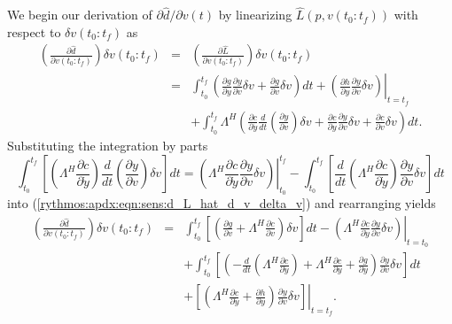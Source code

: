 \documentclass[pdf,ps2pdf,11pt]{SANDreport}
\begin{document}
We begin our derivation of $\partial {}\hat{d} / {}\partial v(t)$ by
linearizing $\hat{L}(p,v(t_0:t_f))$ with respect to $\delta
v(t_0:t_f)$ as
%
\begin{eqnarray}
\left( \frac{\partial \hat{d}}{\partial v(t_0:t_f)} \right) \delta v(t_0:t_f)
& = & \left( \frac{\partial \hat{L}}{\partial v(t_0:t_f)} \right) \delta v(t_0:t_f)
\nonumber \\
& = & \int_{t_0}^{t_f} \left( \frac{\partial g}{\partial y} \frac{\partial y}{\partial v} \delta v +  \frac{\partial g}{\partial v} \delta v \right) dt
+ \left. \left(  \frac{\partial h}{\partial y} \frac{\partial y}{\partial v} \delta v \right) \right|_{t=t_f}
\nonumber \\
& & + \int_{t_0}^{t_f} \Lambda^H \left( \frac{\partial c}{\partial \dot{y}} \frac{d}{dt}\left( \frac{\partial y}{\partial v} \right) \delta v
   + \frac{\partial c}{\partial y} \frac{\partial y}{\partial v} \delta v +  \frac{\partial c}{\partial v} \delta v \right) dt.
\label{rythmos:apdx:eqn:sens:d_L_hat_d_v_delta_v}
\end{eqnarray}
%
Substituting the integration by parts
%
\begin{equation}
\int_{t_0}^{t_f} \left[ \left( \Lambda^H \frac{\partial c}{\partial \dot{y}} \right) \frac{d}{dt}\left( \frac{\partial y}{\partial v} \right) \delta v \right] dt
= \left. \left( \Lambda^H \frac{\partial c}{\partial \dot{y}} \frac{\partial y}{\partial v} \delta v \right) \right|_{t_0}^{t_f}
- \int_{t_0}^{t_f} \left[ \frac{d}{dt}\left( \Lambda^H \frac{\partial c}{\partial \dot{y}} \right) \frac{\partial y}{\partial v} \delta v \right] dt
\end{equation}
%
into (\ref{rythmos:apdx:eqn:sens:d_L_hat_d_v_delta_v}) and rearranging
yields
%
\begin{eqnarray}
\left( \frac{\partial \hat{d}}{\partial v(t_0:t_f)} \right) \delta v(t_0:t_f)
& = & \int_{t_0}^{t_f} \left[ \left(
    \frac{\partial g}{\partial v}
    + \Lambda^H \frac{\partial c}{\partial v}
  \right) \delta v \right] dt
  - \left. \left( \Lambda^H \frac{\partial c}{\partial \dot{y}} \frac{\partial y}{\partial v} \delta v \right) \right|_{t=t_0}
\nonumber \\
& & + \int_{t_0}^{t_f} \left[ \left(
    - \frac{d}{dt}\left( \Lambda^H \frac{\partial c}{\partial \dot{y}} \right)
    +  \Lambda^H \frac{\partial c}{\partial y} +  \frac{\partial g}{\partial y}
  \right) \frac{\partial y}{\partial v} \delta v \right] dt
\nonumber \\
& & + \left. \left[ \left(
    \Lambda^H \frac{\partial c}{\partial \dot{y}}
    +  \frac{\partial h}{\partial y}
  \right)  \frac{\partial y}{\partial v} \delta v \right] \right|_{t=t_f}
\label{rythmos:apdx:eqn:sens:d_L_hat_d_v_delta_v_2}.
\end{eqnarray}
\end{document}
